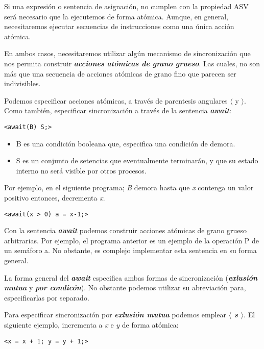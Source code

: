\documentclass[a4paper, 10pt]{report}
\begin{document}
Si una expresión o sentencia de asignación, no cumplen con la propiedad ASV será necesario que la ejecutemos de forma atómica. Aunque, en general, necesitaremos ejecutar secuencias de instrucciones como una única acción atómica.

En ambos casos, necesitaremos utilizar algún mecanismo de sincronización que nos permita construir \textbf{\emph{acciones atómicas de grano grueso}}. Las cuales, no son más que una secuencia de acciones atómicas de grano fino que parecen ser indivisibles.

Podemos especificar acciones atómicas, a través de parentesis angulares \textbf{\emph{$\langle$}} y \textbf{\emph{$\rangle$}}. Como también, especificar sincronización a través de la sentencia \textbf{\emph{await}}:

\begin{lstlisting}
<await(B) S;>
\end{lstlisting}

\begin{itemize}
    \item B es una condición booleana que, especifica una condición de demora.
    \item S es un conjunto de setencias que eventualmente terminarán, y que su estado interno no será visible por otros procesos.
\end{itemize}

Por ejemplo, en el siguiente programa; \emph{B} demora hasta que \emph{x} contenga un valor positivo entonces, decrementa \emph{x}.

\begin{lstlisting}
<await(x > 0) a = x-1;>
\end{lstlisting}

Con la sentencia \textbf{\emph{await}} podemos construir acciones atómicas de grano grueso arbitrarias. Por ejemplo, el programa anterior es un ejemplo de la operación P de un semáforo a. No obstante, es complejo implementar esta sentencia en su forma general.

La forma general del \textbf{\emph{await}} especifica ambas formas de sincronización (\textbf{\emph{exlusión mutua}} y \textbf{\emph{por condicón}}). No obstante podemos utilizar su abreviación para, especificarlas por separado.

Para especificar sincronización por \textbf{\emph{exlusión mutua}} podemos emplear \textbf{\emph{$\langle$ s $\rangle$}}. El siguiente ejemplo, incrementa a \emph{x} e \emph{y} de forma atómica:

\begin{lstlisting}
<x = x + 1; y = y + 1;>
\end{lstlisting}
\end{document}
